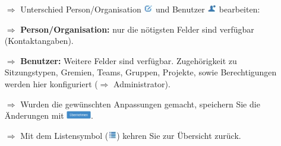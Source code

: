 \documentclass{article}
\begin{document}
\begin{multicols}{2}
\begin{tcolorbox}[colback=blue!5,colframe=blue!40!black,title={Personen/Organisationen, sowie Benutzer bearbeiten}]
\begin{itemize}
  \item[$\Longrightarrow$] Unterschied Person/Organisation \includegraphics[height=10pt]{Icons/bearbeiten.jpg} und Benutzer \includegraphics[height=10pt]{Icons/User.jpg} bearbeiten:
  \item[$\Longrightarrow$] \textbf{Person/Organisation:} nur die nötigsten Felder sind verfügbar (Kontaktangaben).
  \item[$\Longrightarrow$] \textbf{Benutzer:} Weitere Felder sind verfügbar. Zugehörigkeit zu Sitzungstypen, Gremien, Teams, Gruppen, Projekte, sowie Berechtigungen werden hier konfiguriert ($\Longrightarrow$ Administrator).
  \item[$\Longrightarrow$] Wurden die gewünschten Anpassungen gemacht, speichern Sie die Änderungen mit \includegraphics[height=10pt]{Icons/B_Uebernehmen.jpg}.
	\item[$\Longrightarrow$] Mit dem Listensymbol (\includegraphics[height=10pt]{Icons/Listensymbol_zurueck.jpg}) kehren Sie zur Übersicht zurück.
\end{itemize}
\end{tcolorbox}

\end{multicols}

\end{document}
